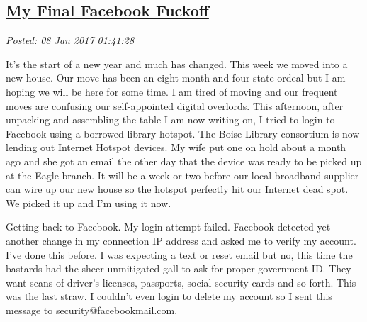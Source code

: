 %

\subsection*{\href{https://conceptcontrol.smugmug.com/search\#q=me}{My Final Facebook Fuckoff}}


\noindent\emph{Posted: 08 Jan 2017 01:41:28}
\vspace{6pt}

It's the start of a new year and much has changed. This week we moved
into a new house. Our move has been an eight month and four state ordeal
but I am hoping we will be here for some time. I am tired of moving and
our frequent moves are confusing our self-appointed digital overlords.
This afternoon, after unpacking and assembling the table I am now
writing on, I tried to login to Facebook using a borrowed library
hotspot. The Boise Library consortium is now lending out Internet
Hotspot devices. My wife put one on hold about a month ago and she got
an email the other day that the device was ready to be picked up at the
Eagle branch. It will be a week or two before our local broadband
supplier can wire up our new house so the hotspot perfectly hit our
Internet dead spot. We picked it up and I'm using it now.

Getting back to Facebook. My login attempt failed. Facebook detected yet
another change in my connection IP address and asked me to verify my
account. I've done this before. I was expecting a text or reset email
but no, this time the bastards had the sheer unmitigated gall to ask for
proper government ID. They want scans of driver's licenses, passports,
social security cards and so forth. This was the last straw. I couldn't
even login to delete my account so I sent this message to
security@facebookmail.com.

